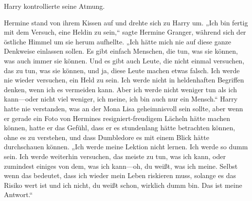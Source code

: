 Harry kontrollierte seine Atmung.

Hermine stand von ihrem Kissen auf und drehte sich zu Harry um.
„Ich bin fertig mit dem Versuch, eine Heldin zu sein,“ sagte Hermine Granger, während sich der östliche Himmel um sie herum aufhellte.
„Ich hätte mich nie auf diese ganze Denkweise einlassen sollen. Es gibt einfach Menschen, die tun, was sie können, was auch immer sie können. Und es gibt auch Leute, die nicht einmal versuchen, das zu tun, was sie können, und ja, diese Leute machen etwas falsch. Ich werde nie wieder versuchen, ein Held zu sein. Ich werde nicht in heldenhaften Begriffen denken, wenn ich es vermeiden kann. Aber ich werde nicht weniger tun als ich kann—oder nicht viel weniger, ich meine, ich bin auch nur ein Mensch.“
Harry hatte nie verstanden, was an der Mona Lisa geheimnisvoll sein sollte, aber wenn er gerade ein Foto von Hermines resigniert-freudigem Lächeln hätte machen können, hatte er das Gefühl, dass er es stundenlang hätte betrachten können, ohne es zu verstehen, und dass Dumbledore es mit einem Blick hätte durchschauen können.
„Ich werde meine Lektion nicht lernen. Ich werde so dumm sein. Ich werde weiterhin versuchen, das meiste zu tun, was ich kann, oder zumindest einiges von dem, was ich kann—oh, du weißt, was ich meine. Selbst wenn das bedeutet, dass ich wieder mein Leben riskieren muss, solange es das Risiko wert ist und ich nicht, du weißt schon, wirklich dumm bin. Das ist meine Antwort.“

